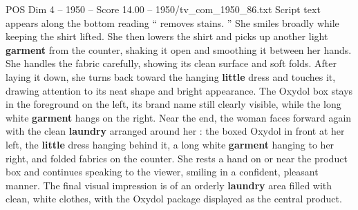 \begin{textsample}{POS Dim 4 – 1950 – Score 14.00 – 1950/tv\_com\_1950\_86.txt}
Script text appears along the bottom reading “ removes stains. ” She smiles broadly while keeping the shirt lifted.
She then lowers the shirt and picks up another light \textbf{garment} from the counter, shaking it open and smoothing it between her hands.
She handles the fabric carefully, showing its clean surface and soft folds.
After laying it down, she turns back toward the hanging \textbf{little} dress and touches it, drawing attention to its neat shape and bright appearance.
The Oxydol box stays in the foreground on the left, its brand name still clearly visible, while the long white \textbf{garment} hangs on the right.
Near the end, the woman faces forward again with the clean \textbf{laundry} arranged around her : the boxed Oxydol in front at her left, the \textbf{little} dress hanging behind it, a long white \textbf{garment} hanging to her right, and folded fabrics on the counter.
She rests a hand on or near the product box and continues speaking to the viewer, smiling in a confident, pleasant manner.
The final visual impression is of an orderly \textbf{laundry} area filled with clean, white clothes, with the Oxydol package displayed as the central product.

\end{textsample}
